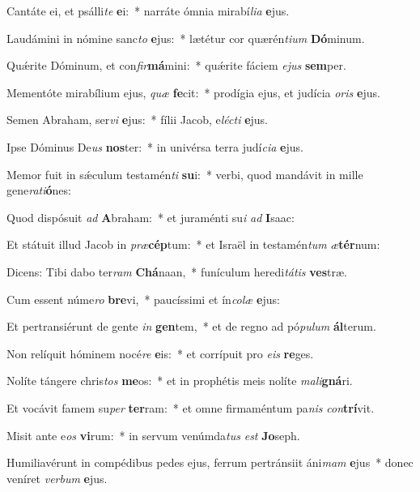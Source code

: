\item Cantáte ei, et psálli\textit{te} \textbf{e}i:~* narráte ómnia mirabí\textit{li}\textit{a} \textbf{e}jus.
\item Laudámini in nómine sanc\textit{to} \textbf{e}jus:~* lætétur cor quærén\textit{ti}\textit{um} \textbf{Dó}minum.
\item Quǽrite Dóminum, et con\textit{fir}\textbf{má}mini:~* quǽrite fáciem \textit{e}\textit{jus} \textbf{sem}per.
\item Mementóte mirabílium ejus, \textit{quæ} \textbf{fe}cit:~* prodígia ejus, et judícia \textit{o}\textit{ris} \textbf{e}jus.
\item Semen Abraham, ser\textit{vi} \textbf{e}jus:~* fílii Jacob, e\textit{léc}\textit{ti} \textbf{e}jus.
\item Ipse Dóminus De\textit{us} \textbf{nos}ter:~* in univérsa terra judí\textit{ci}\textit{a} \textbf{e}jus.
\item Memor fuit in sǽculum testamén\textit{ti} \textbf{su}i:~* verbi, quod mandávit in mille gene\textit{ra}\textit{ti}\textbf{ó}nes:
\item Quod dispósuit \textit{ad} \textbf{A}braham:~* et juraménti su\textit{i} \textit{ad} \textbf{I}saac:
\item Et státuit illud Jacob in \textit{præ}\textbf{cép}tum:~* et Israël in testamén\textit{tum} \textit{æ}\textbf{tér}num:
\item Dicens: Tibi dabo ter\textit{ram} \textbf{Chá}naan,~* funículum heredi\textit{tá}\textit{tis} \textbf{ves}træ.
\item Cum essent núme\textit{ro} \textbf{bre}vi,~* paucíssimi et ín\textit{co}\textit{læ} \textbf{e}jus:
\item Et pertransiérunt de gente \textit{in} \textbf{gen}tem,~* et de regno ad pó\textit{pu}\textit{lum} \textbf{ál}terum.
\item Non relíquit hóminem nocé\textit{re} \textbf{e}is:~* et corrípuit pro \textit{e}\textit{is} \textbf{re}ges.
\item Nolíte tángere chris\textit{tos} \textbf{me}os:~* et in prophétis meis nolíte \textit{ma}\textit{li}\textbf{gná}ri.
\item Et vocávit famem su\textit{per} \textbf{ter}ram:~* et omne firmaméntum pa\textit{nis} \textit{con}\textbf{trí}vit.
\item Misit ante e\textit{os} \textbf{vi}rum:~* in servum venúmda\textit{tus} \textit{est} \textbf{Jo}seph.
\item Humiliavérunt in compédibus pedes ejus, ferrum pertránsiit áni\textit{mam} \textbf{e}jus~* donec veníret \textit{ver}\textit{bum} \textbf{e}jus.
